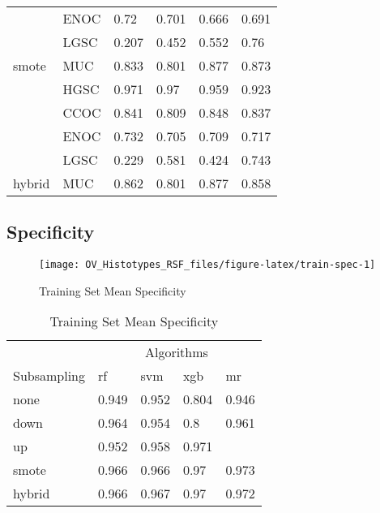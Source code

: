 \documentclass[
]{report}
\begin{document}
\begin{table}
\begin{tabular}[t]{l|l|l|l|l|l}
\cline{2-6}
 & ENOC & 0.72 & 0.701 & 0.666 & 0.691\\
\cline{2-6}
 & LGSC & 0.207 & 0.452 & 0.552 & 0.76\\
\cline{2-6}
\multirow{-5}{*}{\raggedright\arraybackslash smote} & MUC & 0.833 & 0.801 & 0.877 & 0.873\\
\cline{1-6}
 & HGSC & 0.971 & 0.97 & 0.959 & 0.923\\
\cline{2-6}
 & CCOC & 0.841 & 0.809 & 0.848 & 0.837\\
\cline{2-6}
 & ENOC & 0.732 & 0.705 & 0.709 & 0.717\\
\cline{2-6}
 & LGSC & 0.229 & 0.581 & 0.424 & 0.743\\
\cline{2-6}
\multirow{-5}{*}{\raggedright\arraybackslash hybrid} & MUC & 0.862 & 0.801 & 0.877 & 0.858\\
\hline
\end{tabular}
\end{table}

\subsection{Specificity}\label{specificity-1}

\begin{figure}[H]

{\centering \texttt{[image: OV\_Histotypes\_RSF\_files/figure-latex/train-spec-1]} 

}

\caption{Training Set Mean Specificity}\label{fig:train-spec}
\end{figure}

\begin{table}

\caption{\label{tab:train-spec-table}Training Set Mean Specificity}
\centering
\begin{tabular}[t]{l|l|l|l|l}
\hline
\multicolumn{1}{c|}{ } & \multicolumn{4}{c}{Algorithms} \\
\cline{2-5}
Subsampling & rf & svm & xgb & mr\\
\hline
none & 0.949 & 0.952 & 0.804 & 0.946\\
\hline
down & 0.964 & 0.954 & 0.8 & 0.961\\
\hline
up & 0.952 & 0.958 & 0.971 & \cellcolor[HTML]{90ee90}{0.974}\\
\hline
smote & 0.966 & 0.966 & 0.97 & 0.973\\
\hline
hybrid & 0.966 & 0.967 & 0.97 & 0.972\\
\hline
\end{tabular}
\end{table}
\end{document}
